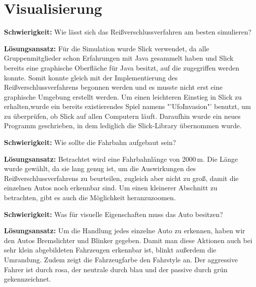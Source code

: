 \section{Visualisierung}
\textbf{Schwierigkeit:} Wie lässt sich das Reißverschlussverfahren am besten simulieren?
\begin{addmargin}[25pt]{0pt}
	\item \textbf{Lösungsansatz:} Für die Simulation wurde Slick verwendet, da alle Gruppenmitglieder schon Erfahrungen mit Java gesammelt haben und Slick bereits eine graphische Oberfläche für Java besitzt, auf die zugegriffen werden konnte. Somit konnte gleich mit der Implementierung des Reißverschlussverfahrens begonnen werden und es musste nicht erst eine graphische Umgebung erstellt werden. Um einen leichteren Einstieg in Slick zu erhalten,wurde ein bereits existierendes Spiel namens "'UfoInvasion"' benutzt, um zu überprüfen, ob Slick auf allen Computern läuft. Daraufhin wurde ein neues Programm geschrieben, in dem lediglich die Slick-Library übernommen wurde. \\
\end{addmargin}
\textbf{Schwierigkeit:} Wie sollte die Fahrbahn aufgebaut sein?
\begin{addmargin}[25pt]{0pt}
	\item \textbf{Lösungsansatz:} Betrachtet wird eine Fahrbahnlänge von 2000\,m. Die Länge wurde gewählt, da sie lang genug ist, um die Auswirkungen des Reißverschlussverfahrens zu beurteilen, zugleich aber nicht zu groß, damit die einzelnen Autos noch erkennbar sind. Um einen kleinerer Abschnitt zu betrachten, gibt es auch die Möglichkeit heranzuzoomen.\\
\end{addmargin}
\textbf{Schwierigkeit:} Was für visuelle Eigenschaften muss das Auto besitzen?
\begin{addmargin}[25pt]{0pt}
	\item \textbf{Lösungsansatz:} Um die Handlung jedes einzelne Auto zu erkennen, haben wir den Autos Bremslichter und Blinker gegeben. Damit man diese Aktionen auch bei sehr klein abgebildeten Fahrzeugen erkennbar ist, blinkt außerdem die Umrandung. Zudem zeigt die Fahrzeugfarbe den Fahrstyle an. Der aggressive Fahrer ist durch rosa, der neutrale durch blau und der passive durch grün gekennzeichnet.\\
\end{addmargin}

